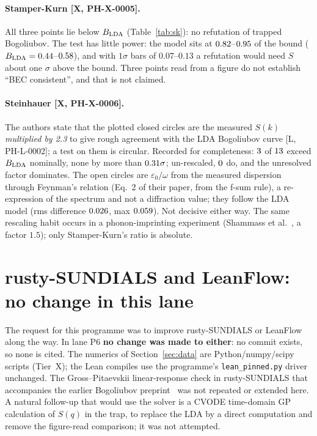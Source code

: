 \documentclass[11pt]{article}
\theoremstyle{remark}
\newcommand{\tier}[1]{\textsf{[#1]}}
\newcommand{\eps}{\varepsilon}
\begin{document}
\paragraph{Stamper-Kurn \tier{X, PH-X-0005}.} All three points lie below $B_{\rm LDA}$ (Table~\ref{tab:sk}): no refutation of trapped Bogoliubov. The test has little power: the model sits at $0.82$--$0.95$ of the bound ($B_{\rm LDA}=0.44$--$0.58$), and with $1\sigma$ bars of $0.07$--$0.13$ a refutation would need $S$
about one $\sigma$ above the bound. Three points read from a figure do not establish ``BEC consistent'', and that is not claimed.

\paragraph{Steinhauer \tier{X, PH-X-0006}.} The authors state that the plotted closed circles are the measured $S(k)$ \emph{multiplied by 2.3} to give rough agreement with the LDA Bogoliubov curve \tier{L, PH-L-0002}; a test on them is circular. Recorded for completeness: $3$ of $13$ exceed $B_{\rm LDA}$ nominally, none by more than $0.31\sigma$; un-rescaled, $0$ do, and the unresolved factor dominates. The open circles are $\eps_0/\omega$ from the measured
dispersion through Feynman's relation (Eq.~2 of their paper, from the f-sum rule), a re-expression of the spectrum and not a diffraction value; they follow the LDA model (rms difference $0.026$, max $0.059$). Not decisive either way. The same rescaling habit occurs in a phonon-imprinting experiment (Shammass et al.~\cite{sham}, a factor $1.5$);
only Stamper-Kurn's ratio is absolute.

\section{rusty-SUNDIALS and LeanFlow: no change in this lane}\label{sec:rusty}
The request for this programme was to improve rusty-SUNDIALS or LeanFlow along the way. In lane P6 \textbf{no change was made to either}: no commit exists, so none is cited. The numerics of Section~\ref{sec:data} are Python/numpy/scipy scripts (Tier~X); the Lean compiles use the programme's
\texttt{lean\_pinned.py} driver unchanged. The Gross--Pitaevskii linear-response check in rusty-SUNDIALS that accompanies the earlier Bogoliubov preprint~\cite{bsk} was not repeated or extended here. A natural follow-up that would use the solver is a CVODE time-domain GP calculation of $S(q)$ in the trap, to replace the LDA by a direct
computation and remove the figure-read comparison; it was not attempted.
\end{document}
